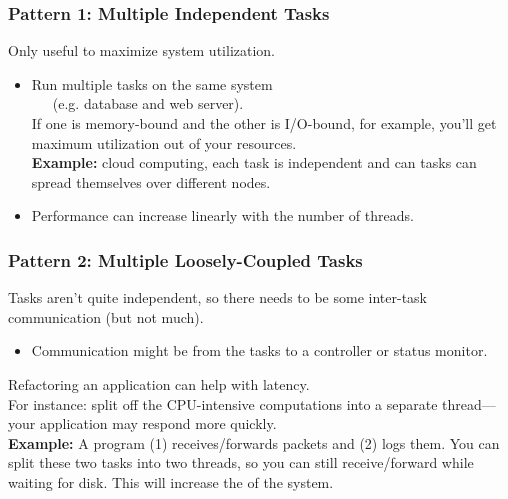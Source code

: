 \begin{frame}
  \frametitle{Pattern 1: Multiple Independent Tasks}

  
    Only useful to maximize system utilization.
  \begin{itemize}
    \item Run multiple tasks on the same system \\ ~~~(e.g. database and web server).\\[1em]
     If one is memory-bound and the other is I/O-bound, for example, you'll
      get maximum utilization out of your resources.\\[1em]
     {\bf Example:} cloud computing, each task is independent and can
      tasks can spread themselves over different nodes.\\[1em]
    \item Performance can increase linearly with the number of threads.
  \end{itemize}
  
\end{frame}

\begin{frame}
  \frametitle{Pattern 2: Multiple Loosely-Coupled Tasks}

  
    Tasks aren't quite independent, so there needs to be some inter-task
      communication (but not much).
  \begin{itemize}

    \item Communication might be from the tasks to a controller or status
      monitor.
  \end{itemize}

    Refactoring an application can help with latency. \\
For instance: split off
      the CPU-intensive computations into a separate thread---your application may
      respond more quickly.\\[1em]
     {\bf Example:} A program (1) receives/forwards packets and (2) logs them. You
      can split these two tasks into two threads, so you can still
      receive/forward while waiting for disk. This will increase the
       of the system.
  
\end{frame}

